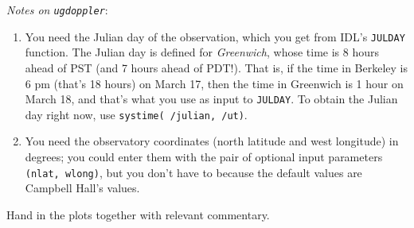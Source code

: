\documentclass[11pt,preprint]{aastex}
\begin{document}
\begin{enumerate}
{\it Notes on \verb$ugdoppler$}: \begin{enumerate}

\item You need the Julian day of the observation, which you get from
  IDL's {\tt JULDAY} function. The Julian day is defined for {\it
  Greenwich}, whose time is 8 hours ahead of PST (and 7 hours ahead of
  PDT!). That is, if the time in Berkeley is 6 pm (that's 18 hours) on
  March 17, then the time in Greenwich is 1 hour on March 18, and that's
  what you use as input to {\tt JULDAY}. To obtain the Julian day right
  now, use {\tt systime( /julian, /ut)}. 

\item You need the observatory coordinates (north latitude and west
  longitude) in degrees; you could enter them with the pair of optional
  input parameters {\tt (nlat, wlong)}, but you don't have to because the
  default values are Campbell Hall's values.

\end{enumerate}
\end{enumerate}

Hand in the plots together with relevant commentary.
\end{document}
